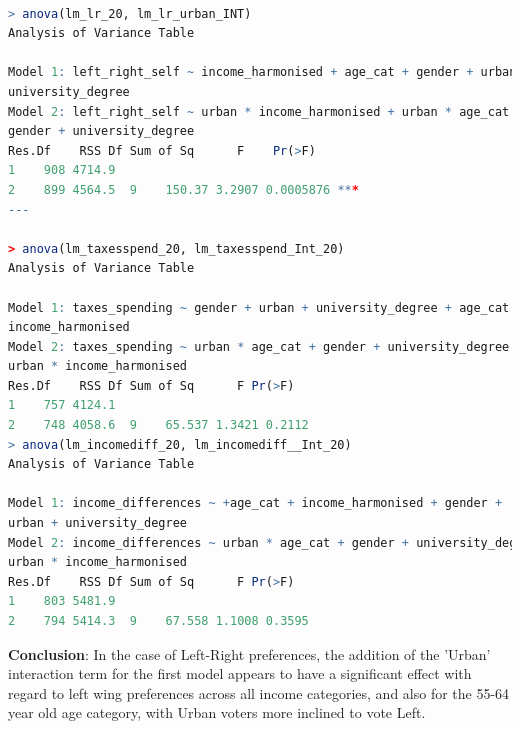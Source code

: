 \documentclass[12pt,letterpaper]{article}
\begin{document}
\begin{lstlisting}[language=R]
	
> anova(lm_lr_20, lm_lr_urban_INT)
Analysis of Variance Table

Model 1: left_right_self ~ income_harmonised + age_cat + gender + urban + 
university_degree
Model 2: left_right_self ~ urban * income_harmonised + urban * age_cat + 
gender + university_degree
Res.Df    RSS Df Sum of Sq      F    Pr(>F)    
1    908 4714.9                                  
2    899 4564.5  9    150.37 3.2907 0.0005876 ***
---

> anova(lm_taxesspend_20, lm_taxesspend_Int_20)
Analysis of Variance Table

Model 1: taxes_spending ~ gender + urban + university_degree + age_cat + 
income_harmonised
Model 2: taxes_spending ~ urban * age_cat + gender + university_degree + 
urban * income_harmonised
Res.Df    RSS Df Sum of Sq      F Pr(>F)
1    757 4124.1                           
2    748 4058.6  9    65.537 1.3421 0.2112
> anova(lm_incomediff_20, lm_incomediff__Int_20)
Analysis of Variance Table

Model 1: income_differences ~ +age_cat + income_harmonised + gender + 
urban + university_degree
Model 2: income_differences ~ urban * age_cat + gender + university_degree + 
urban * income_harmonised
Res.Df    RSS Df Sum of Sq      F Pr(>F)
1    803 5481.9                           
2    794 5414.3  9    67.558 1.1008 0.3595
\end{lstlisting}

\vspace{2cm}
\noindent \textbf{Conclusion}: In the case of Left-Right preferences, the addition of the 'Urban' interaction term for the first model appears to have a significant effect with regard to left wing preferences across all income categories, and also for the 55-64 year old age category, with Urban voters more inclined to vote Left.

\newpage
\end{document}
